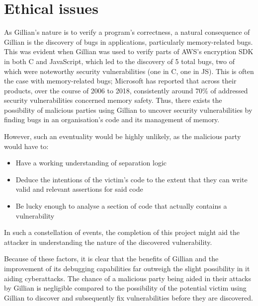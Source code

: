 
\chapter{Ethical issues}
\label{cha:ethics}

As Gillian's nature is to verify a program's correctness, a natural consequence of Gillian is the discovery of bugs in applications, particularly memory-related bugs.
This was evident when Gillian was used to verify parts of AWS's encryption SDK in both C and JavaScript, which led to the discovery of 5 total bugs, two of which were noteworthy security vulnerabilities (one in C, one in JS)\cite{gillian-part2}.
This is often the case with memory-related bugs; Microsoft has reported that across their products, over the course of 2006 to 2018, consistently around 70\% of addressed security vulnerabilities concerned memory safety\cite{microsoft-memory-bugs}.
Thus, there exists the possibility of malicious parties using Gillian to uncover security vulnerabilities by finding bugs in an organisation's code and its management of memory.

However, such an eventuality would be highly unlikely, as the malicious party would have to:
\begin{itemize}
  \item Have a working understanding of separation logic
  \item Deduce the intentions of the victim's code to the extent that they can write valid and relevant assertions for said code
  \item Be lucky enough to analyse a section of code that actually contains a vulnerability
\end{itemize}

In such a constellation of events, the completion of this project might aid the attacker in understanding the nature of the discovered vulnerability.

Because of these factors, it is clear that the benefits of Gillian and the improvement of its debugging capabilities far outweigh the slight possibility in it aiding cyberattacks.
The chance of a malicious party being aided in their attacks by Gillian is negligible compared to the possibility of the potential victim using Gillian to discover and subsequently fix vulnerabilities before they are discovered.
